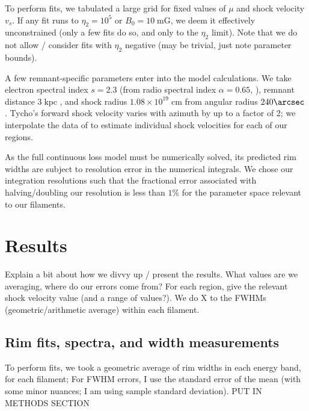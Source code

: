 \documentclass[12pt,preprint]{aastex}  %
\newcommand*{\mt}{\mathrm}
\newcommand*{\unit}[1]{\;\mt{#1}}  %
\begin{document}
To perform fits, we tabulated a large grid for fixed values of $\mu$ and shock
velocity $v_s$.  If any fit runs to $\eta_2 = 10^5$ or $B_0 = 10 \unit{mG}$,
we deem it effectively unconstrained (only a few fits do so, and only to the
$\eta_2$ limit).
Note that we do not allow / consider fits with $\eta_2$ negative (may be
trivial, just note parameter bounds).

A few remnant-specific parameters enter into the model calculations.  We take
electron spectral index $s = 2.3$ (from radio spectral index $\alpha = 0.65$,
\citet{kothes2006} ),
remnant distance $3 \unit{kpc}$ \citep[cf.][]{hayato2010}, and
shock radius $1.08 \times 10^{19} \unit{cm}$ from angular radius $240\arcsec$
\citep{green2009}.  Tycho's forward shock velocity varies with azimuth by up to
a factor of 2; we interpolate the data of \citet{williams2013} to estimate
individual shock velocities for each of our regions.

As the full continuous loss model must be numerically solved, its predicted
rim widths are subject to resolution error in the numerical integrals.  We
chose our integration resolutions such that the fractional error associated
with halving/doubling our resolution is less than $1\%$ for the
parameter space relevant to our filaments. 

\section{Results}

Explain a bit about how we divvy up / present the results.  What values are we
averaging, where do our errors come from?
For each region, give the relevant shock velocity value (and a range of
values?).
We do X to the FWHMs (geometric/arithmetic average) within each filament.

\subsection{Rim fits, spectra, and width measurements}

To perform fits, we took a geometric average of rim widths in each energy band,
for each filament; 
For FWHM errors, I use the standard error of the mean (with some
minor nuances; I am using sample standard deviation).
PUT IN METHODS SECTION
\end{document}
